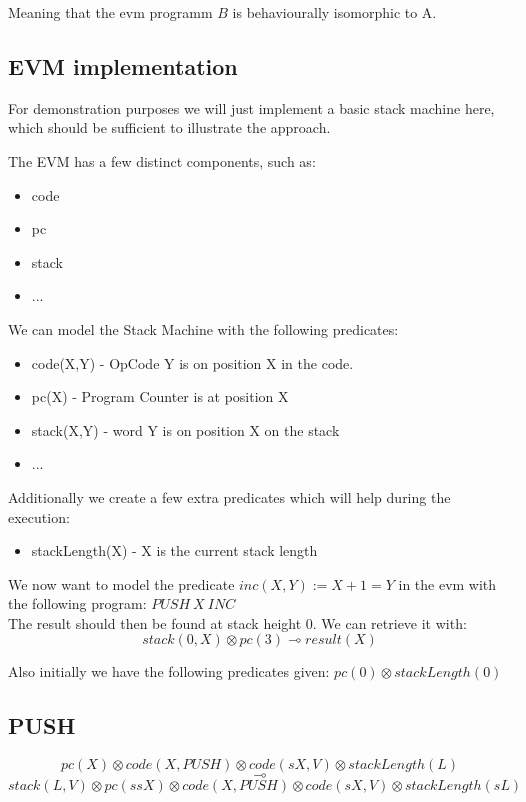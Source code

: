 \documentclass[sigconf]{acmart}
\begin{document}
Meaning that the evm programm $B$ is behaviourally isomorphic to A.

\subsection*{EVM implementation}
For demonstration purposes we will just implement a basic stack machine here, which should be sufficient to illustrate the approach.

The EVM has a few distinct components, such as:

\begin{itemize}
  \item code
  \item pc
  \item stack
  \item ...
\end{itemize}


We can model the Stack Machine with the following predicates:

\begin{itemize}
  \item code(X,Y) - OpCode Y is on position X in the code.
  \item pc(X) - Program Counter is at position X
  \item stack(X,Y) - word Y is on position X on the stack
  \item ...
\end{itemize}


Additionally we create a few extra predicates which will help during the execution:
\begin{itemize}
  \item stackLength(X) - X is the current stack length
\end{itemize}

We now want to model the predicate $inc(X,Y) := X + 1 = Y$ in the evm with the following program: $PUSH\ X\ INC$\\ The result should then be found at stack height 0. We can retrieve it with:
\[ stack(0, X) \otimes pc(3) \multimap result(X) \]


Also initially we have the following predicates given:
$pc(0) \otimes stackLength(0)$

\subsection*{PUSH}

  $$ pc(X)\otimes code(X, PUSH) \otimes code(sX, V)\otimes stackLength(L)$$
  $$\multimap$$
  $$stack(L, V)\otimes pc(ssX)\otimes code(X, PUSH)\otimes code(sX, V)\otimes stackLength(sL)$$
\end{document}
